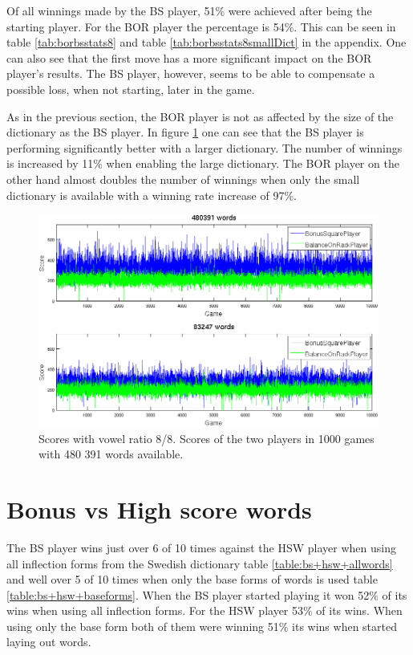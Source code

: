 \documentclass[a4paper, 12pt]{report}
\begin{document}
Of all winnings made by the BS player, 51\% were achieved after being the starting player. For the BOR player the percentage is 54\%. This can be seen in table \ref{tab:borbsstats8} and table \ref{tab:borbsstats8smallDict} in the appendix. One can also see that the first move has a more significant impact on the BOR player's results. The BS player, however, seems to be able to compensate a possible loss, when not starting, later in the game.

As in the previous section, the BOR player is not as affected by the size of the dictionary as the BS player. In figure \ref{fig:bonusBalanceLargeDict} one can see that the BS player is performing significantly better with a larger dictionary. The number of winnings is increased by 11\% when enabling the large dictionary. The BOR player on the other hand almost doubles the number of winnings when only the small dictionary is available with a winning rate increase of 97\%. 



\begin{figure}[h]
\centering
\includegraphics[scale=0.4]{BonusBalance8vow_bothDict_cropped}
\caption {Scores with vowel ratio 8/8. Scores of the two players in 1000 games with 480 391 words available.}
\label{fig:bonusBalanceLargeDict}
\end{figure}



\section{Bonus vs High score words}
\label{sec:bonusHigh}
The BS player wins just over 6 of 10 times against the HSW player when using all inflection forms from the Swedish dictionary table \ref{table:bs+hsw+allwords} and well over 5 of 10 times when only the base forms of words is used table \ref{table:bs+hsw+baseforms}. When the BS player started playing it won 52\% of its wins when using all inflection forms. For the HSW player 53\% of its wins. When using only the base form both of them were winning 51\% its wins when started laying out words.
\end{document}
